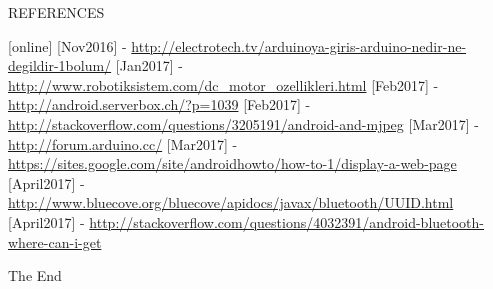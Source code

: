 \documentclass[xcolor=table, 9pt]{beamer}
\begin{document}


\begin{frame}{REFERENCES}
\begin{thebibliography}{9}
[online]
 {\scriptsize [Nov2016] - \url{http://electrotech.tv/arduinoya-giris-arduino-nedir-ne-degildir-1bolum/}}
 {\scriptsize [Jan2017] - \url{http://www.robotiksistem.com/dc_motor_ozellikleri.html}}
 {\scriptsize [Feb2017] - \url{http://android.serverbox.ch/?p=1039}}
 {\scriptsize [Feb2017] - \url{http://stackoverflow.com/questions/3205191/android-and-mjpeg}}
 {\scriptsize [Mar2017] - \url{http://forum.arduino.cc/}}
 {\scriptsize [Mar2017] - \url{https://sites.google.com/site/androidhowto/how-to-1/display-a-web-page}}
 {\scriptsize [April2017] - \url{http://www.bluecove.org/bluecove/apidocs/javax/bluetooth/UUID.html}}
 {\scriptsize [April2017] - \url{http://stackoverflow.com/questions/4032391/android-bluetooth-where-can-i-get}}
\end{thebibliography}
\end{frame}




\begin{frame}
\Huge{\centerline{The End}}
\end{frame}
\end{document}
